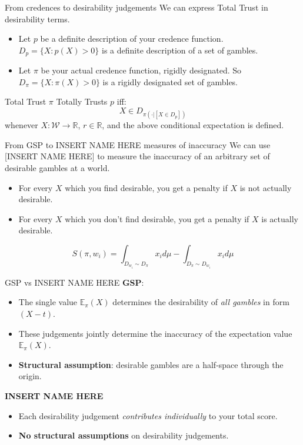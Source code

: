 \documentclass[aspectratio=169, dvipsnames]{beamer}
\newcommand{\R}{\mathbb{R}}
\newcommand{\E}{\mathbb{E}}
\newcommand{\W}{\mathcal{W}}
\begin{document}
\begin{frame}{From credences to desirability judgements}
  We can express Total Trust in desirability terms.
  \begin{itemize}
  \item Let $p$ be a definite description of your credence function. $D_p = \{X : p(X) > 0\}$ is a definite description of a set of gambles.
  \item Let $\pi$ be your actual credence function, rigidly designated. So $D_{\pi} = \{X: \pi(X) > 0\}$ is a rigidly designated set of gambles.
  \end{itemize}
  \begin{block}{Total Trust}
    $\pi$ Totally Trusts $p$ iff:
    \begin{equation}
      \label{totTrust}
      X \in D_{\pi(\cdot| [X \in D_p])}
    \end{equation}
    whenever $X: \W \to \R$, $r \in \R$, and the above conditional expectation is defined.
  \end{block}
\end{frame}

\begin{frame}{From GSP to INSERT NAME HERE measures of inaccuracy}
  We can use [INSERT NAME HERE] to measure the inaccuracy of an arbitrary set of desirable gambles at a
  world.
  \begin{itemize}
  \item For every $X$ which you find desirable, you get a penalty if $X$ is not actually desirable.
  \item For every $X$ which you don't find desirable, you get a penalty if $X$ is actually desirable.
  \end{itemize}
  \begin{equation}
      \label{KonekScoreDefAppendix}
      S(\pi, w_i) = \int_{D_{w_i} \sim D_{\pi}} x_i d\mu - \int_{D_{\pi} \sim D_{w_i}} x_i d\mu 
    \end{equation}
\end{frame}

\begin{frame}{GSP vs INSERT NAME HERE}
  \textbf{GSP}:
  \begin{itemize}
  \item The single value $\E_{\pi}(X)$ determines the desirability of \textit{all gambles} in form $(X - t)$.
  \item These judgements jointly determine the inaccuracy of the expectation value $\E_{\pi}(X)$.
  \item \alert{\textbf{Structural assumption}}: desirable gambles are a half-space through the origin.
  \end{itemize}
  \textbf{INSERT NAME HERE}
  \begin{itemize}
  \item Each desirability judgement \textit{contributes individually} to your total score.
  \item \alert{\textbf{No structural assumptions}} on desirability judgements.
  \end{itemize}
\end{frame}
\end{document}
